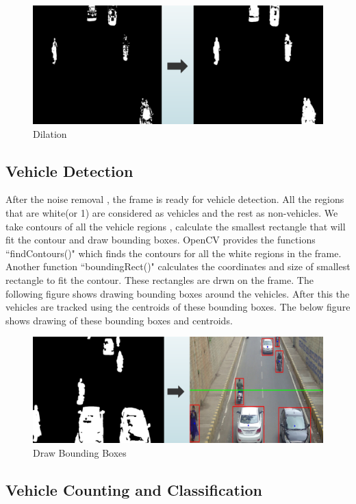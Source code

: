 \documentclass[12pt, a4paper]{article}
\begin{document}
\begin{figure}[h!]\includegraphics[width=\linewidth]{dilation.png}\caption{Dilation}\end{figure}
\begin{large}\subsection{Vehicle Detection}\end{large}
\hspace{3cm}
After the noise removal , the frame is ready for vehicle detection. All the regions that are white(or 1) are considered as vehicles and the rest as non-vehicles. We take contours of all the vehicle regions , calculate the smallest rectangle that will fit the contour and draw bounding boxes. OpenCV provides the functions ``findContours()" which finds the contours for all the white regions in the frame. Another function ``boundingRect()" calculates the coordinates and size of smallest rectangle to fit the contour. These rectangles are drwn on the frame. The following figure shows drawing bounding boxes around the vehicles. After this the vehicles are tracked using the centroids of these bounding boxes. The below figure shows drawing of these bounding boxes and centroids.\\
\begin{figure}[h!]\includegraphics[width=\linewidth]{bounding.png}\caption{Draw Bounding Boxes}\end{figure}
\begin{large}\subsection{Vehicle Counting and Classification}\end{large}
\end{document}
